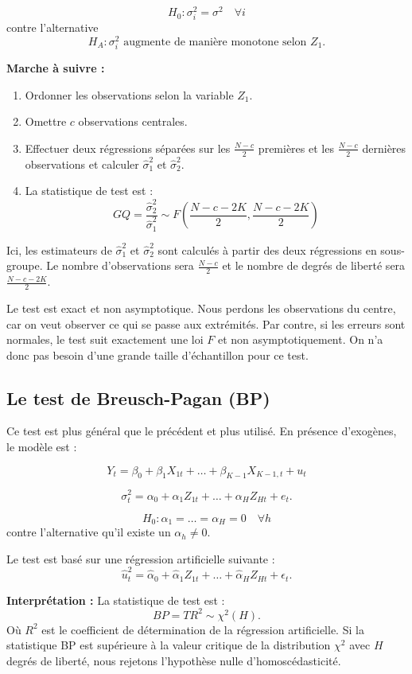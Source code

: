 \documentclass[14pt]{extarticle} %
\theoremstyle{definition}
\theoremstyle{plain}
\begin{document}
\[
H_0: \sigma_i^2 = \sigma^2 \quad \forall i
\]
contre l’alternative
\[
H_A : \sigma_i^2 \text{ augmente de manière monotone selon } Z_1.
\]

\textbf{Marche à suivre :}
\begin{enumerate}
    \item Ordonner les observations selon la variable $Z_1$.
    \item Omettre $c$ observations centrales.
    \item Effectuer deux régressions séparées sur les $\frac{N-c}{2}$ premières et les $\frac{N-c}{2}$ dernières observations et calculer $\hat{\sigma}_1^2$ et $\hat{\sigma}_2^2$.
    \item La statistique de test est :
    \[
    GQ = \frac{\hat{\sigma}_2^2}{\hat{\sigma}_1^2} \sim F\left( \frac{N - c - 2K}{2}, \frac{N - c - 2K}{2} \right)
    \]
\end{enumerate}

Ici, les estimateurs de $\hat{\sigma}_1^2$ et $\hat{\sigma}_2^2$ sont calculés à partir des deux régressions en sous-groupe. Le nombre d’observations sera $\frac{N-c}{2}$ et le nombre de degrés de liberté sera $\frac{N-c-2K}{2}$.

Le test est exact et non asymptotique. Nous perdons les observations du centre, car on veut observer ce qui se passe aux extrémités. Par contre, si les erreurs sont normales, le test suit exactement une loi $F$ et non asymptotiquement. On n’a donc pas besoin d’une grande taille d’échantillon pour ce test.

\subsection{Le test de Breusch-Pagan (BP)}
Ce test est plus général que le précédent et plus utilisé. En présence d’exogènes, le modèle est :

\[
Y_t = \beta_0 + \beta_1 X_{1t} + \dots + \beta_{K-1} X_{K-1,t} + u_t
\]

\[
\sigma_t^2 = \alpha_0 + \alpha_1 Z_{1t} + \dots + \alpha_H Z_{Ht} + e_t.
\]

\[
H_0: \alpha_1 = \dots = \alpha_H = 0 \quad \forall h
\]
contre l’alternative qu’il existe un $\alpha_h \neq 0$.

Le test est basé sur une régression artificielle suivante :
\[
\hat{u}_t^2 = \hat{\alpha}_0 + \hat{\alpha}_1 Z_{1t} + \dots + \hat{\alpha}_H Z_{Ht} + \epsilon_t.
\]

\textbf{Interprétation :} La statistique de test est :
\[
BP = T R^2 \sim \chi^2(H).
\]
Où $R^2$ est le coefficient de détermination de la régression artificielle. Si la statistique BP est supérieure à la valeur critique de la distribution $\chi^2$ avec $H$ degrés de liberté, nous rejetons l'hypothèse nulle d'homoscédasticité.
\end{document}

